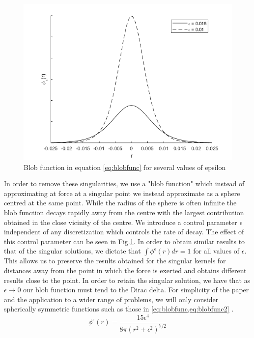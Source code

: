 \begin{figure}
    \centering
    \includegraphics[scale=0.65]{Images/BlobFunction.png}
    \caption{Blob function in equation \cref{eq:blobfunc} for several values of epsilon}
    \label{fig:blobfunc}
\end{figure}

In order to remove these singularities, we use a "blob function" which instead of approximating at force at a singular point we instead approximate as a sphere centred at the same point. While the radius of the sphere is often infinite the blob function decays rapidly away from the centre with the largest contribution obtained in the close vicinity of the centre. We introduce a control parameter $\epsilon$ independent of any discretization which controls the rate of decay. The effect of this control parameter can be seen in Fig.\cref{fig:blobfunc}. In order to obtain similar results to that of the singular solutions, we dictate that $\int \phi^\epsilon(r)dr=1$ for all values of $\epsilon$. This allows us to preserve the results obtained for the singular kernels for distances away from the point in which the force is exerted and obtains different results close to the point. In order to retain the singular solution, we have that as $\epsilon \to 0$ our blob function must tend to the Dirac delta. For simplicity of the paper and the application to a wider range of problems, we will only consider spherically symmetric functions such as those in \cref{eq:blobfunc,eq:blobfunc2} \cite{Cortez2005,Olson2013ModelingFormulation,Nguyen2014ReductionFlow}.
\begin{equation}
\label{eq:blobfunc}
    \phi^\epsilon(r)= \frac{15 \epsilon^4}{8\pi\left( r^2 +\epsilon^2 \right)^{7/2}}
\end{equation}

